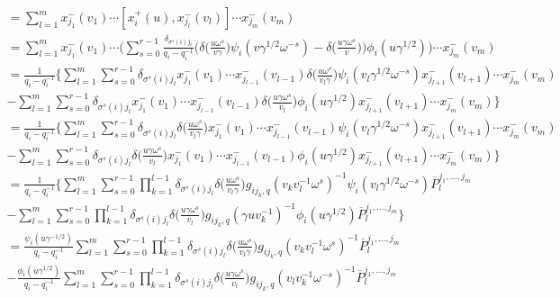 \documentclass[12pt]{amsart}
\numberwithin{equation}{section}
\begin{document}
\begin{multline*}
    [x_i^{+}(u), x_{j_1}^{-}(v_1)\cdots x_{j_m}^{-}(v_m)] = \sum_{l=1}^{m}  x_{j_1}^{-}(v_1)\cdots [x_i^{+}(u), x_{j_{l}}^{-}(v_l)] \cdots  x_{j_m}^{-}(v_m)\\
    = \sum_{l=1}^{m}  x_{j_1}^{-}(v_1)\cdots \Big(\sum_{s=0}^{r-1} \frac{\delta_{\sigma^s(i)j_l}}{q_i-q_i^{-1}}\Big(\delta\Big(\frac{u\omega^s}{v\gamma }\Big)\psi_i(v\gamma^{1/2}\omega^{-s}) - \delta\Big(\frac{u\gamma\omega^s }{v}\Big)\Big)\phi_i(u\gamma^{1/2})\Big) \cdots  x_{j_m}^{-}(v_m)\\
    = \frac{1}{q_i-q_i^{-1}} \Bigg\{\sum_{l=1}^{m} \sum_{s=0}^{r-1} \delta_{\sigma^s(i)j_l} x_{j_1}^{-}(v_1)\cdots x_{j_{l-1}}^{-}(v_{l-1}) \delta\Big(\frac{u\omega^s}{v_l\gamma }\Big)\psi_i(v_l\gamma^{1/2}\omega^{-s})x_{j_{l+1}}^{-}(v_{l+1}) \cdots  x_{j_m}^{-}(v_m)\\
    - \sum_{l=1}^{m} \sum_{s=0}^{r-1} \delta_{\sigma^s(i)j_l} x_{j_1}^{-}(v_1)\cdots x_{j_{l-1}}^{-}(v_{l-1}) \delta\Big(\frac{u\gamma \omega^s}{v_l}\Big)\phi_i(u\gamma^{1/2})x_{j_{l+1}}^{-}(v_{l+1}) \cdots  x_{j_m}^{-}(v_m) \Bigg\}\\
    = \frac{1}{q_i-q_i^{-1}}\Bigg\{\sum_{l=1}^{m} \sum_{s=0}^{r-1} \delta_{\sigma^s(i)j_l}\delta\Big(\frac{u \omega^s}{v_l\gamma }\Big)  x_{j_1}^{-}(v_1)\cdots x_{j_{l-1}}^{-}(v_{l-1}) \psi_i(v_l\gamma^{1/2}\omega^{-s})x_{j_{l+1}}^{-}(v_{l+1}) \cdots  x_{j_m}^{-}(v_m)\\
    - \sum_{l=1}^{m} \sum_{s=0}^{r-1} \delta_{\sigma^s(i)j_l}\delta\Big(\frac{u\gamma \omega^s}{v_l}\Big) x_{j_1}^{-}(v_1)\cdots x_{j_{l-1}}^{-}(v_{l-1}) \phi_i(u\gamma^{1/2})x_{j_{l+1}}^{-}(v_{l+1}) \cdots  x_{j_m}^{-}(v_m) \Bigg\}\\
    = \frac{1}{q_i-q_i^{-1}}\Bigg\{\sum_{l=1}^{m}  \sum_{s=0}^{r-1} \prod_{k=1}^{l-1}\delta_{\sigma^s(i)j_l}\delta\Big(\frac{u \omega^s}{v_l\gamma }\Big)   g_{ij_k,q}(v_{k}v_l^{-1}\omega^s)^{-1} \psi_i(v_l\gamma^{1/2}\omega^{-s}) \overline{P}_l^{j_1, \ldots, j_m}\\
    - \sum_{l=1}^{m} \sum_{s=0}^{r-1} \prod_{k=1}^{l-1}\delta_{\sigma^s(i)j_l}\delta\Big(\frac{u\gamma \omega^s}{v_l}\Big) g_{ij_k,q}(\gamma uv_{k}^{-1})^{-1} \phi_i(u\gamma^{1/2}) \overline{P}_l^{j_1, \ldots, j_m} \Bigg\}\\
    = \frac{\psi_i(u\gamma^{-1/2})}{q_i-q_i^{-1}}\sum_{l=1}^{m}  \sum_{s=0}^{r-1} \prod_{k=1}^{l-1}\delta_{\sigma^s(i)j_l}\delta\Big(\frac{u \omega^s}{v_l\gamma }\Big)   g_{ij_k,q}(v_{k}v_l^{-1}\omega^s)^{-1} \overline{P}_l^{j_1, \ldots, j_m}\\
    - \frac{\phi_i(u\gamma^{1/2}) }{q_i-q_i^{-1}} \sum_{l=1}^{m} \sum_{s=0}^{r-1} \prod_{k=1}^{l-1}\delta_{\sigma^s(i)j_l}\delta\Big(\frac{u\gamma \omega^s}{v_l}\Big) g_{ij_k,q}(v_lv_k^{-1}\omega^{-s})^{-1}\overline{P}_l^{j_1, \ldots, j_m}
\end{multline*}
\end{document}
